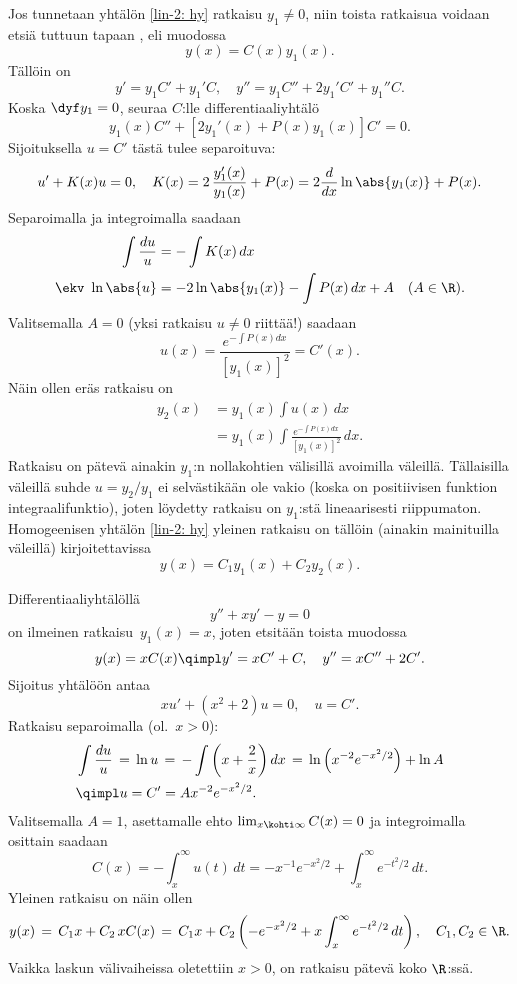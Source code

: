 Jos tunnetaan yhtälön \eqref{lin-2: hy} ratkaisu $y_1\neq 0$, niin toista ratkaisua voidaan 
etsiä tuttuun tapaan  , eli muodossa
\[
y(x)=C(x)y_1(x).
\]
Tällöin on 
\[
y' = y_1C'+y_1'C, \quad y'' = y_1C''+2y_1'C'+y_1''C.
\]
Koska $\dyf y_1=0$, seuraa $C$:lle differentiaaliyhtälö
\[
y_1(x)C''+[2y_1'(x)+P(x)y_1(x)]C'=0.
\]
Sijoituksella $u=C'$ tästä tulee separoituva:
\[
u'+K(x)u=0,\quad K(x)=2\,\frac{y_1'(x)}{y_1(x)}+P(x)=2\frac{d}{dx}\ln\abs{y_1(x)}+P(x).
\]
Separoimalla ja integroimalla saadaan
\begin{align*}
\int\frac{du}{u}  &= -\int K(x)\,dx \\
\ekv \ \ln\abs{u} &= -2\ln\abs{y_1(x)}-\int P(x)\,dx + A \quad (A\in\R).
\end{align*}
Valitsemalla $A=0$ (yksi ratkaisu $u\neq 0$ riittää!) saadaan
\[
u(x)=\frac{e^{-\int P(x)dx}}{[y_1(x)]^2}=C'(x).
\]
Näin ollen eräs ratkaisu on
\begin{align*}
y_2(x) &= y_1(x)\int u(x)\,dx \\
       &= y_1(x) \int \frac{e^{-\int P(x)dx}}{[y_1(x)]^2}\,dx.
\end{align*}
Ratkaisu on pätevä ainakin $y_1$:n nollakohtien välisillä avoimilla väleillä. Tällaisilla
väleillä suhde $u=y_2/y_1$ ei selvästikään ole vakio (koska on positiivisen funktion
integraalifunktio), joten löydetty ratkaisu on $y_1$:stä lineaarisesti riippumaton.
Homogeenisen yhtälön \eqref{lin-2: hy} yleinen ratkaisu on tällöin (ainakin mainituilla
väleillä) kirjoitettavissa
\[
y(x)=C_1y_1(x)+C_2y_2(x).
\]
\begin{Exa} \label{lin-2: Ex4}
Differentiaaliyhtälöllä
\[
y''+xy'-y=0
\]
on ilmeinen ratkaisu $\,y_1(x)=x$, joten etsitään toista muodossa
\[
y(x)=xC(x) \qimpl y'=xC'+C, \quad y''=xC''+2C'.
\]
Sijoitus yhtälöön antaa
\[
xu'+(x^2+2)u=0, \quad u=C'.
\]
Ratkaisu separoimalla (ol.\ $x>0$):
\begin{align*}
&\int\frac{du}{u} \,=\, \ln u
                  \,=\, -\int\left(x+\frac{2}{x}\right)dx 
                  \,=\, \ln\left(x^{-2}e^{-x^2/2}\right)+\ln A \\
&\qimpl u=C'=Ax^{-2}e^{-x^2/2}.
\end{align*}
Valitsemalla $A=1$, asettamalle ehto $\lim_{x\kohti\infty}C(x)=0$ ja integroimalla osittain
saadaan
\[
C(x) = -\int_x^\infty u(t)\,dt = -x^{-1}e^{-x^2/2}+\int_x^\infty e^{-t^2/2}\,dt.
\]
Yleinen ratkaisu on näin ollen
\[
y(x) \,=\, C_1x + C_2\,xC(x)
     \,=\, C_1x + C_2\left(-e^{-x^2/2}+x\int_x^\infty e^{-t^2/2}\,dt\right), \quad C_1,C_2\in\R. 
\]
Vaikka laskun välivaiheissa oletettiin $x>0$, on ratkaisu pätevä koko $\R$:ssä. \loppu
\end{Exa}

